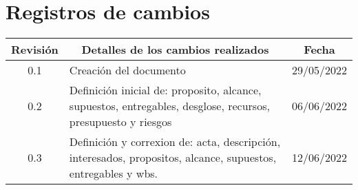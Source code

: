 \section{Registros de cambios}
\label{sec:registro}


\begin{table}[ht]
\label{tab:registro}
\centering
\begin{tabularx}{\linewidth}{@{}|c|X|c|@{}}
\hline
\rowcolor[HTML]{C0C0C0} 
Revisión & \multicolumn{1}{c|}{\cellcolor[HTML]{C0C0C0}Detalles de los cambios realizados} & Fecha      \\ \hline
0.1 & Creación del documento& 29/05/2022\\ \hline
0.2 & Definición inicial de: proposito, alcance, supuestos, entregables, desglose, recursos, presupuesto y riesgos& 06/06/2022\\ \hline
0.3 & Definición y correxion de: acta, descripción, interesados, propositos, alcance, supuestos, entregables y wbs.& 12/06/2022\\ \hline
\end{tabularx}
\end{table}

\pagebreak
